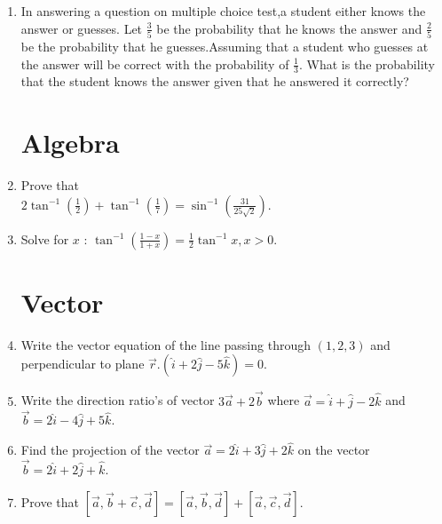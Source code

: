 \documentclass[10pt,-letter paper]{article}
\providecommand{\brak}[1]{\ensuremath{\left(#1\right)}}
\begin{document}
\begin{enumerate}
\item In answering a question on multiple choice test,a student either knows the answer or guesses. Let $\frac{3}{5}$ be the probability that he knows the answer and $\frac{2}{5}$ be the probability that he guesses.Assuming that a student who guesses at the answer will be correct with the probability of $\frac{1}{3}$. What is the probability that the student knows the answer given that he answered it correctly?\\

\section{Algebra}

\item Prove that \\
$2\tan^{-1}{(\frac{1}{2})} + \tan^{-1}{(\frac{1}{7})} = \sin^{-1}{(\frac{31}{25\sqrt{2}})}$.

\item Solve for $x$ : $\tan^{-1}{(\frac{1-x}{1+x})}= \frac{1}{2} \tan^{-1}{x} , x>0$.\\

\section{Vector}

\item Write the vector equation of the line passing through $\brak{1,2,3}$ and perpendicular to plane $\overrightarrow{r}.\brak{\hat{i}+2\hat{j}-5\hat{k}}=0$.\\

\item Write the direction ratio's of vector $3\overrightarrow{a}+2\overrightarrow{b}$ where $\overrightarrow{a} = \hat{i}+\hat{j}-2\hat{k}$ and $\overrightarrow{b}=2\hat{i}-4\hat{j}+5\hat{k}$.\\

\item Find the projection of the vector $\overrightarrow{a} = 2\hat{i}+3\hat{j}+2\hat{k}$ on the vector $\overrightarrow{b} = 2\hat{i}+2\hat{j}+\hat{k}$.\\ 

\item Prove that $[ \overrightarrow{a},\overrightarrow{b} + \overrightarrow{c},\overrightarrow{d}] = [ \overrightarrow{a},\overrightarrow{b},\overrightarrow{d} ] +[ \overrightarrow{a},\overrightarrow{c},\overrightarrow{d} ]$.\\


\end{enumerate}
\end{document}
